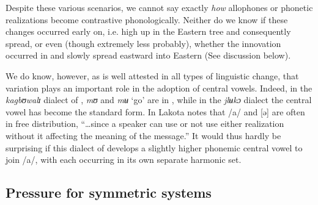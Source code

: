 \documentclass[output=paper,newtxmath,modfonts,nonflat,draft]{langsci/langscibook}
\begin{document}
\begin{table}
\caption{Lakota Dida} 
\label{tab:zogbo:23}
\end{table}

Despite these various scenarios, we cannot say exactly \textit{how} allophones or phonetic realizations become contrastive phonologically.  Neither do we know if these changes occurred early on, i.e. high up in the Eastern  tree and consequently spread, or even (though extremely less probably), whether the innovation occurred in  and slowly spread eastward into Eastern  (See discussion below). 

We do know, however, as is well attested in all types of linguistic change, that variation plays an important role in the adoption of central vowels. Indeed, in the \textit{kagbʊwalɪ} dialect of , \textit{mʊ} and \textit{mʉ} ‘go’ are in , while in the \textit{jlʉkɔ} dialect the central vowel has become the standard form. In Lakota  \citet[48]{Guehoun1993} notes that /a/ and [ə] are often in free distribution, “…since a speaker can use or not use either realization without it affecting the meaning of the message.”  It would thus hardly be surprising if this dialect of  develops a slightly higher phonemic central vowel to join /a/, with each occurring in its own separate harmonic set.      

\subsection{Pressure for symmetric systems}\label{sec:zogbo:4.4} 
\end{document}
